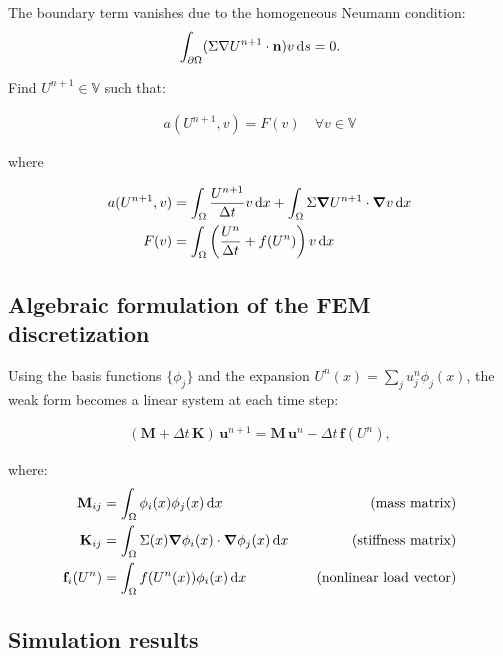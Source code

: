 \documentclass[unicode,11pt,a4paper,oneside,numbers=endperiod,openany]{article}
\begin{document}
The boundary term vanishes due to the homogeneous Neumann condition:
\[
	\int_{\partial \Omega} (\Sigma \nabla U^{n+1} \cdot \mathbf{n}) v \,\diffd s = 0.
\]

Find $U^{n+1} \in \mathbb{V}$ such that:

\begin{align*}
	a(U^{n+1}, v) = F(v) \quad \forall v \in \mathbb{V}
\end{align*}

where

\begin{align*}
	a(U^{n+1}, v) & = \int_\Omega \frac{U^{n+1}}{\Delta t} v\,\diffd x
	+ \int_\Omega \Sigma \grad U^{n+1} \cdot \grad v\,\diffd x                             \\
	F(v)          & = \int_\Omega \left( \frac{U^n}{\Delta t} + f(U^n) \right) v\,\diffd x
\end{align*}


\subsection{Algebraic formulation of the FEM discretization}

Using the basis functions $\{\phi_j\}$ and the expansion $U^n(x) = \sum_j u_j^n \phi_j(x)$, the weak form becomes a linear system at
each time step:

\begin{align*}
	(\mathbf M + \Delta t\, \mathbf K)\, \mathbf u^{n+1} = \mathbf M\, \mathbf u^n - \Delta t\, \mathbf f(U^n),
\end{align*}

where:
\begin{align*}
	\mathbf M_{ij}   & = \int_\Omega \phi_i(x) \phi_j(x)\,\diffd x \quad                             & \text{(mass matrix)}           \\
	\mathbf K_{ij}   & = \int_\Omega \Sigma(x) \grad \phi_i(x) \cdot \grad \phi_j(x)\,\diffd x \quad & \text{(stiffness matrix)}      \\
	\mathbf f_i(U^n) & = \int_\Omega f(U^n(x)) \phi_i(x)\,\diffd x \quad                             & \text{(nonlinear load vector)}
\end{align*}


\subsection{Simulation results}
\end{document}

